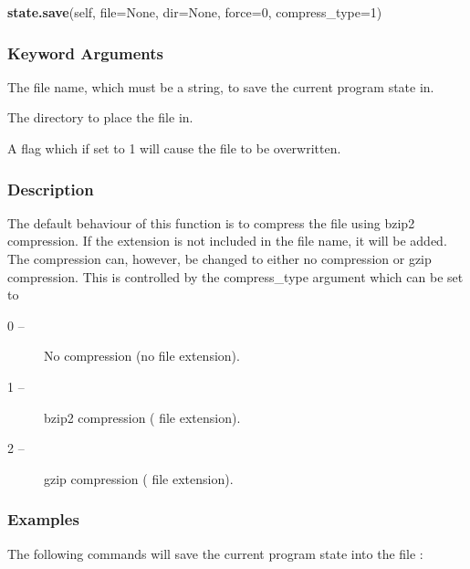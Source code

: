  \textsf{\textbf{state.save}(self, file=None, dir=None, force=0, compress\_type=1)} 

  
 \subsubsection{Keyword Arguments} 

   The file name, which must be a string, to save the current program state in.   

   The directory to place the file in.   

   A flag which if set to 1 will cause the file to be overwritten.  

  

  
 \subsubsection{Description} 

 The default behaviour of this function is to compress the file using bzip2 compression.  If the extension  is not included in the file name, it will be added.  The compression can, however, be changed to either no compression or gzip compression.  This is controlled by the compress\_type argument which can be set to 
  

 \begin{description} 
 \item[0 --]  No compression (no file extension).  
 \item[1 --]  bzip2 compression ( file extension).  
 \item[2 --]  gzip compression ( file extension).  
 \end{description} 
  

  
 \subsubsection{Examples} 

 The following commands will save the current program state into the file : 
  



